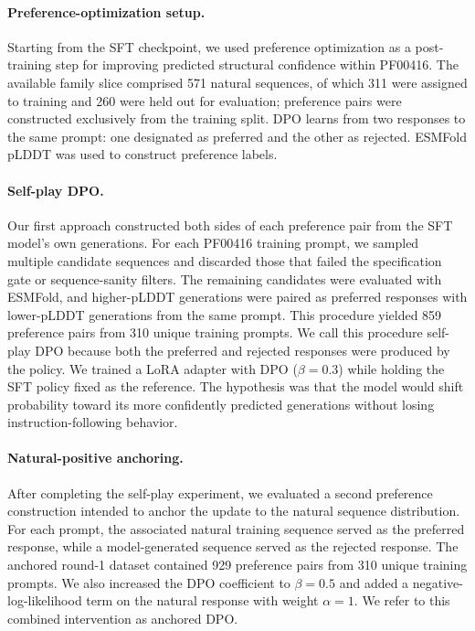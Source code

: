 \documentclass{article}
\begin{document}
\paragraph{Preference-optimization setup.}
Starting from the SFT checkpoint, we used preference optimization as a post-training step for improving predicted structural confidence within PF00416. The available family slice comprised 571 natural sequences, of which 311 were assigned to training and 260 were held out for evaluation; preference pairs were constructed exclusively from the training split. DPO learns from two responses to the same prompt: one designated as preferred and the other as rejected. ESMFold pLDDT was used to construct preference labels. 

\paragraph{Self-play DPO.}
Our first approach constructed both sides of each preference pair from the SFT model’s own generations. For each PF00416 training prompt, we sampled multiple candidate sequences and discarded those that failed the specification gate or sequence-sanity filters. The remaining candidates were evaluated with ESMFold, and higher-pLDDT generations were paired as preferred responses with lower-pLDDT generations from the same prompt. This procedure yielded 859 preference pairs from 310 unique training prompts. We call this procedure self-play DPO because both the preferred and rejected responses were produced by the policy. We trained a LoRA adapter with DPO ($\beta=0.3$) while holding the SFT policy fixed as the reference. The hypothesis was that the model would shift probability toward its more confidently predicted generations without losing instruction-following behavior.

\paragraph{Natural-positive anchoring.}
After completing the self-play experiment, we evaluated a second preference construction intended to anchor the update to the natural sequence distribution. For each prompt, the associated natural training sequence served as the preferred response, while a model-generated sequence served as the rejected response. The anchored round-1 dataset contained 929 preference pairs from 310 unique training prompts. We also increased the DPO coefficient to $\beta=0.5$ and added a negative-log-likelihood term on the natural response with weight $\alpha=1$. We refer to this combined intervention as anchored DPO.
\end{document}
